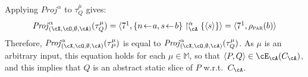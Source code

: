 \documentclass[prodmode,acmtocl]{acmsmall}
\newcommand{\caX}{\cX}
\def\prog{\ensuremath{P}\xspace}
\def\progq{\ensuremath{Q}\xspace}
\def\trace{\ensuremath{\tau}\xspace}
\def\memory{\ensuremath{\mu}\xspace}
\def\memories{\ensuremath{\mathbb{M}}\xspace}
\newcommand{\BIND}[2]{#1\!\leftarrow\!#2}
\def\crit{\ensuremath{C}\xspace}
\def\uco{\ensuremath{\rho}\xspace}
\newcommand{\ABSMEM}[3]{#1 \upharpoonright^\alpha_{#3} #2}
\def\Proj{\ensuremath{\mathit{Proj}}\xspace}
\def\tuple#1{\langle #1 \rangle}
\newcommand{\0}{\mbox{\bf 0}}
\def\PARDOM{\ensuremath{\uco_{\textsc{par}}}\xspace}
\begin{document}
\begin{example}
\begin{center}
\end{center}
  Applying $\Proj^\alpha$ to $\trace_\progq^\memory$
  gives: \[ \begin{array}{rcl}
    \Proj^\alpha_{(\caX,\cO,\emptyset,\cA)}(\trace_\progq^\memory)
   =\tuple{7^1, \ABSMEM{\{\BIND{n}{a}, \BIND{s}{b}\}}{\{\langle s
       \rangle\}}{\cA}} = \tuple{7^1, \PARDOM(b)} \end{array} \]
  Therefore,
  $\Proj^\alpha_{(\caX,\cO,\emptyset,\cA)}(\trace_\prog^\memory)$ is
  equal to
  $\Proj^\alpha_{(\caX,\cO,\emptyset,\cA)}(\trace_\progq^\memory)$.
  As $\memory$ is an arbitrary input, this equation holds for each
  $\memory \in \memories$, so that $\tuple{\prog,\progq} \in
  \cE_{\cA}(\crit_{\cA})$, and this implies that $\progq$ is an
  abstract static slice of $\prog$ w.r.t.~$\crit_{\cA}$.
\end{example}
\end{document}
